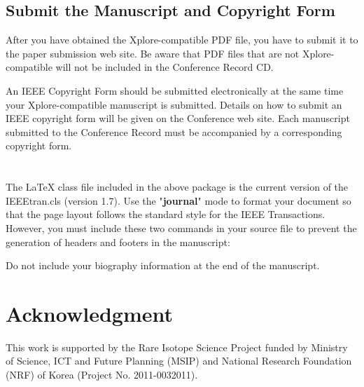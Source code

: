 \documentclass[journal]{IEEEtran}
\begin{document}
\subsection{Submit the Manuscript and Copyright Form}

After you have obtained the Xplore-compatible PDF file, you have to submit it to the paper submission web site. Be aware that PDF files that are not Xplore-compatible will not be included in the Conference Record CD.


An IEEE Copyright Form should be submitted electronically at the same time your Xplore-compatible manuscript is submitted. Details on how to submit an IEEE copyright form will be given on the Conference web site.  Each manuscript submitted to the Conference Record must be accompanied by a corresponding copyright form. 

\newpage


\appendices
\section{}

The {\LaTeX} class file included in the above package is the current version of the IEEEtran.cls (version 1.7).  Use the "{\bf journal}" mode to format your document so that the page layout follows the standard style for the IEEE Transactions. However, you must include these two commands in your source file to prevent the generation of headers and footers in the manuscript:

Do not include your biography information at the end of the manuscript.  



\section*{Acknowledgment}
This work is supported by the Rare Isotope Science Project funded by Ministry of Science, ICT and Future Planning {(MSIP)} and National Research Foundation {(NRF)} of Korea (Project No. 2011-0032011).

\end{document}
